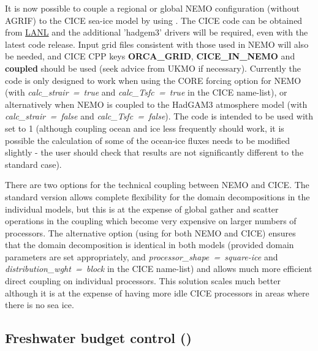 \documentclass[NEMO_book]{subfiles}
\begin{document}
It is now possible to couple a regional or global NEMO configuration (without AGRIF) to the CICE sea-ice
model by using .  The CICE code can be obtained from 
\href{http://oceans11.lanl.gov/trac/CICE/}{LANL} and the additional 'hadgem3' drivers will be required, 
even with the latest code release.  Input grid files consistent with those used in NEMO will also be needed, 
and CICE CPP keys \textbf{ORCA\_GRID}, \textbf{CICE\_IN\_NEMO} and \textbf{coupled} should be used (seek advice from UKMO 
if necessary).  Currently the code is only designed to work when using the CORE forcing option for NEMO (with
\textit{calc\_strair~=~true} and \textit{calc\_Tsfc~=~true} in the CICE name-list), or alternatively when NEMO 
is coupled to the HadGAM3 atmosphere model (with \textit{calc\_strair~=~false} and \textit{calc\_Tsfc~=~false}).
The code is intended to be used with  set to 1 (although coupling ocean and ice less frequently 
should work, it is possible the calculation of some of the ocean-ice fluxes needs to be modified slightly - the
user should check that results are not significantly different to the standard case).

There are two options for the technical coupling between NEMO and CICE.  The standard version allows
complete flexibility for the domain decompositions in the individual models, but this is at the expense of global
gather and scatter operations in the coupling which become very expensive on larger numbers of processors. The
alternative option (using  for both NEMO and CICE) ensures that the domain decomposition is
identical in both models (provided domain parameters are set appropriately, and 
\textit{processor\_shape~=~square-ice} and \textit{distribution\_wght~=~block} in the CICE name-list) and allows
much more efficient direct coupling on individual processors.  This solution scales much better although it is at 
the expense of having more idle CICE processors in areas where there is no sea ice.

\subsection   [Freshwater budget control (\textit{sbcfwb})]
			{Freshwater budget control ()}
\label{SBC_fwb}
\end{document}
